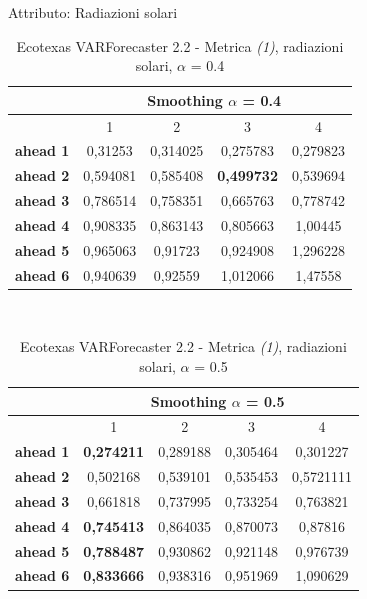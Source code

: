 \documentclass[12pt,a4paper,oneside,openright]{book}
\begin{document}
\medskip


Attributo: Radiazioni solari \\ 

\begin{table}[H]
\centering
\begin{tabular}{|c|c|c|c|c|}
\hline
 & \multicolumn{4}{|c|}{Smoothing $\alpha$ = 0.4} \\
\hline
& 1 & 2 & 3 & 4 \\
\hline
\textbf{ahead 1} & 0,31253 & 0,314025 & 0,275783 & 0,279823\\
\hline
\textbf{ahead 2} & 0,594081 & 0,585408 & \textbf{0,499732} & 0,539694\\ 
\hline
\textbf{ahead 3} & 0,786514 & 0,758351 & 0,665763 & 0,778742\\
\hline
\textbf{ahead 4} & 0,908335 & 0,863143 & 0,805663 & 1,00445\\ 
\hline
\textbf{ahead 5} & 0,965063 & 0,91723 & 0,924908 & 1,296228\\
\hline
\textbf{ahead 6} & 0,940639 & 0,92559 & 1,012066 & 1,47558\\ 
\hline
\end{tabular} \\
\caption{Ecotexas VARForecaster 2.2 - Metrica \textit{(1)}, radiazioni solari, $\alpha$ = 0.4}
\end{table} 

\medskip

\begin{table}[H]
\centering
\begin{tabular}{|c|c|c|c|c|}
\hline
 & \multicolumn{4}{|c|}{Smoothing $\alpha$ = 0.5} \\
\hline
& 1 & 2 & 3 & 4 \\
\hline
\textbf{ahead 1} & \textbf{0,274211} & 0,289188 & 0,305464 & 0,301227\\
\hline
\textbf{ahead 2} & 0,502168 & 0,539101 & 0,535453 & 0,5721111\\ 
\hline
\textbf{ahead 3} & 0,661818 & 0,737995 & 0,733254 & 0,763821\\
\hline
\textbf{ahead 4} & \textbf{0,745413} & 0,864035 & 0,870073 & 0,87816\\ 
\hline
\textbf{ahead 5} & \textbf{0,788487} & 0,930862 & 0,921148 & 0,976739\\
\hline
\textbf{ahead 6} & \textbf{0,833666} & 0,938316 & 0,951969 & 1,090629\\ 
\hline
\end{tabular} \\
\caption{Ecotexas VARForecaster 2.2 - Metrica \textit{(1)}, radiazioni solari, $\alpha$ = 0.5}
\end{table} 
\end{document}
